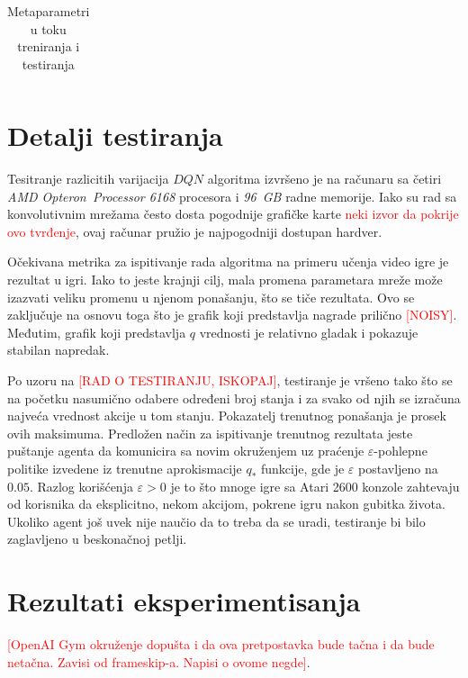 \begin{table}
\begin{tabularx}{\textwidth}{|l|c|X|}
\end{tabularx}
\caption{Metaparametri u toku treniranja i testiranja}
\label{tbl:metaparametri}
\end{table}

\section{Detalji testiranja}
\label{sec:testiranje}
Tesitranje razlicitih varijacija $DQN$ algoritma izvršeno je na računaru sa četiri {\em AMD Opteron\texttrademark ~Processor 6168} procesora i {\em 96~GB} radne memorije. Iako su rad sa konvolutivnim mrežama često dosta pogodnije grafičke karte \textcolor{red}{neki izvor da pokrije ovo tvrđenje}, ovaj računar pružio je najpogodniji dostupan hardver. 
\par 
Očekivana metrika za ispitivanje rada algoritma na primeru učenja video igre je rezultat u igri. Iako to jeste krajnji cilj, mala promena parametara mreže može izazvati veliku promenu u njenom ponašanju, što se tiče rezultata. Ovo se zaključuje na osnovu toga što je grafik koji predstavlja nagrade prilično \textcolor{red}{[NOISY]}. Međutim, grafik koji predstavlja $q$ vrednosti je relativno gladak i pokazuje stabilan napredak.
\par 
Po uzoru na \textcolor{red}{[RAD O TESTIRANJU, ISKOPAJ]}, testiranje je vršeno tako što se  na početku nasumično odabere određeni broj stanja i za svako od njih se izračuna najveća vrednost akcije u tom stanju. Pokazatelj trenutnog ponašanja je prosek ovih maksimuma. Predložen način za ispitivanje trenutnog rezultata jeste puštanje agenta da komunicira sa novim okruženjem uz praćenje $\varepsilon$-pohlepne politike izvedene iz trenutne aprokismacije $q_*$ funkcije, gde je $\varepsilon$ postavljeno na $0.05$. Razlog korišćenja $\varepsilon > 0$ je to što mnoge igre sa Atari 2600 konzole zahtevaju od korisnika da eksplicitno, nekom akcijom, pokrene igru nakon gubitka života. Ukoliko agent još uvek nije naučio da to treba da se uradi, testiranje bi bilo zaglavljeno u beskonačnoj petlji.
\section{Rezultati eksperimentisanja}

%
\textcolor{red}{[OpenAI Gym okruženje dopušta i da ova pretpostavka bude tačna i da bude netačna. Zavisi od frameskip-a. Napisi o ovome negde]}.

